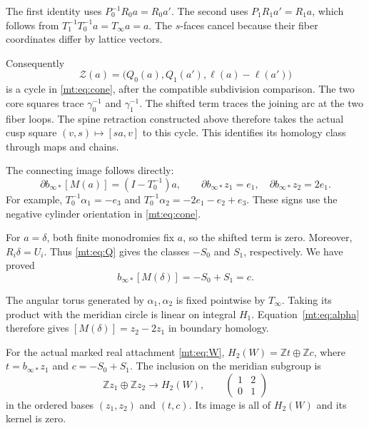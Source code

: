 The first identity uses $P_0^{-1}R_0a=R_0a'$.
The second uses $P_1R_1a'=R_1a$,
which follows from $T_1^{-1}T_0^{-1}a=T_\infty a=a$.
The $s$-faces cancel because their fiber coordinates differ by lattice vectors.

Consequently
\begin{equation}\label{mt:eq:Zchain}
\mathcal Z(a)=\bigl(Q_0(a),Q_1(a'),\ell(a)-\ell(a')\bigr)
\end{equation}
is a cycle in \eqref{mt:eq:cone}, after the compatible subdivision comparison.
The two core squares trace $\gamma_0^{-1}$ and $\gamma_1^{-1}$.
The shifted term traces the joining arc at the two fiber loops.
The spine retraction constructed above therefore takes the actual cusp
square $(v,s)\mapsto[sa,v]$ to this cycle.
This identifies its homology class through maps and chains.

The connecting image follows directly:
\begin{equation}\label{mt:eq:connecting}
\partial b_{\infty*}[M(a)]=(I-T_0^{-1})a,\qquad
\partial b_{\infty*}z_1=e_1,\quad
\partial b_{\infty*}z_2=2e_1.
\end{equation}
For example, $T_0^{-1}\alpha_1=-e_3$ and
$T_0^{-1}\alpha_2=-2e_1-e_2+e_3$.
These signs use the negative cylinder orientation in \eqref{mt:eq:cone}.

For $a=\delta$, both finite monodromies fix $a$, so the shifted term is zero.
Moreover, $R_i\delta=U_i$.
Thus \eqref{mt:eq:Q} gives the classes $-S_0$ and $S_1$, respectively.
We have proved
\begin{equation}\label{mt:eq:delta}
b_{\infty*}[M(\delta)]=-S_0+S_1=c.
\end{equation}

The angular torus generated by $\alpha_1,\alpha_2$ is fixed pointwise by $T_\infty$.
Taking its product with the meridian circle is linear on integral $H_1$.
Equation~\eqref{mt:eq:alpha} therefore gives
$[M(\delta)]=z_2-2z_1$ in boundary homology.

\begin{theorem}\label{mt:thm:map}
For the actual marked real attachment \eqref{mt:eq:W},
$H_2(W)=\mathbb Zt\oplus\mathbb Zc$, where
$t=b_{\infty*}z_1$ and $c=-S_0+S_1$.
The inclusion on the meridian subgroup is
\begin{equation}\label{mt:eq:answer}
\mathbb Zz_1\oplus\mathbb Zz_2\longrightarrow H_2(W),\qquad
\begin{pmatrix}1&2\\0&1\end{pmatrix}
\end{equation}
in the ordered bases $(z_1,z_2)$ and $(t,c)$.
Its image is all of $H_2(W)$ and its kernel is zero.
\end{theorem}

